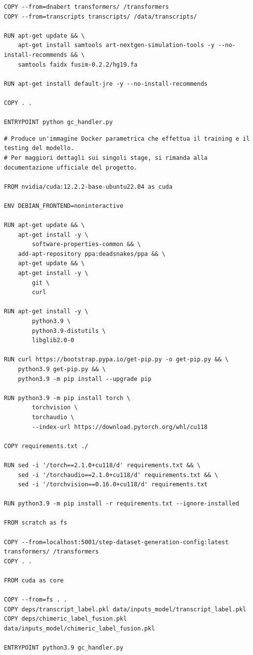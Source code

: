 \begin{code}
\begin{verbatim}
COPY --from=dnabert transformers/ /transformers
COPY --from=transcripts transcripts/ /data/transcripts/
    
RUN apt-get update && \
    apt-get install samtools art-nextgen-simulation-tools -y --no-install-recommends && \
    samtools faidx fusim-0.2.2/hg19.fa
    
RUN apt-get install default-jre -y --no-install-recommends
    
COPY . .
    
ENTRYPOINT python gc_handler.py
\end{verbatim}
\end{code}

\begin{code}
\label{code:apx:a:dockerfile}
\begin{verbatim}
# Produce un'immagine Docker parametrica che effettua il training e il testing del modello.
# Per maggiori dettagli sui singoli stage, si rimanda alla documentazione ufficiale del progetto.

FROM nvidia/cuda:12.2.2-base-ubuntu22.04 as cuda

ENV DEBIAN_FRONTEND=noninteractive

RUN apt-get update && \
    apt-get install -y \
        software-properties-common && \
    add-apt-repository ppa:deadsnakes/ppa && \
    apt-get update && \
    apt-get install -y \
        git \
        curl

RUN apt-get install -y \ 
        python3.9 \
        python3.9-distutils \
        libglib2.0-0

RUN curl https://bootstrap.pypa.io/get-pip.py -o get-pip.py && \
    python3.9 get-pip.py && \
    python3.9 -m pip install --upgrade pip

RUN python3.9 -m pip install torch \
        torchvision \
        torchaudio \
        --index-url https://download.pytorch.org/whl/cu118

COPY requirements.txt ./

RUN sed -i '/torch==2.1.0+cu118/d' requirements.txt && \
    sed -i '/torchaudio==2.1.0+cu118/d' requirements.txt && \
    sed -i '/torchvision==0.16.0+cu118/d' requirements.txt

RUN python3.9 -m pip install -r requirements.txt --ignore-installed

FROM scratch as fs

COPY --from=localhost:5001/step-dataset-generation-config:latest transformers/ /transformers
COPY . .

FROM cuda as core

COPY --from=fs . .
COPY deps/transcript_label.pkl data/inputs_model/transcript_label.pkl
COPY deps/chimeric_label_fusion.pkl data/inputs_model/chimeric_label_fusion.pkl

ENTRYPOINT python3.9 gc_handler.py
\end{verbatim}
\end{code}

